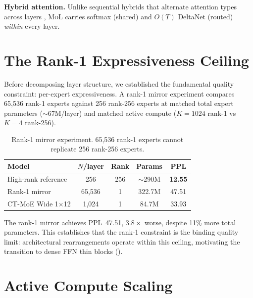 \documentclass[10pt]{article}
\newcommand{\mol}{\textsc{MoL}}
\newcommand{\Paragraph}[1]{\vspace{0.5em}\noindent\textbf{#1}}
\begin{document}
\Paragraph{Hybrid attention.}
Unlike sequential hybrids that alternate attention types across layers \citep{qwen3next_2025, glorioso2024zamba, gu2024mamba, peng2023rwkv}, \mol{} carries softmax (shared) and $O(T)$ DeltaNet \citep{yang2024gated} (routed) \emph{within} every layer.




\appendix

\section{The Rank-1 Expressiveness Ceiling}
\label{app:rank1}

Before decomposing layer structure, we established the fundamental quality constraint: per-expert expressiveness.
A rank-1 mirror experiment compares 65,536 rank-1 experts against 256 rank-256 experts at matched total expert parameters (${\sim}67$M/layer) and matched active compute ($K{=}1024$ rank-1 vs $K{=}4$ rank-256).

\begin{table}[h]
\centering
\caption{Rank-1 mirror experiment. 65,536 rank-1 experts cannot replicate 256 rank-256 experts.}
\label{tab:rank1_mirror}
\small
\begin{tabular}{lcccc}
\toprule
Model & $N$/layer & Rank & Params & PPL \\
\midrule
High-rank reference & 256 & 256 & ${\sim}$290M & \textbf{12.55} \\
Rank-1 mirror & 65,536 & 1 & 322.7M & 47.51 \\
CT-MoE Wide 1$\times$12 & 1,024 & 1 & 84.7M & 33.93 \\
\bottomrule
\end{tabular}
\end{table}

The rank-1 mirror achieves PPL~47.51, $3.8\times$ worse, despite 11\% more total parameters.
This establishes that the rank-1 constraint is the binding quality limit: architectural rearrangements operate within this ceiling, motivating the transition to dense FFN thin blocks ().

\section{Active Compute Scaling}
\label{app:active_compute}
\end{document}
